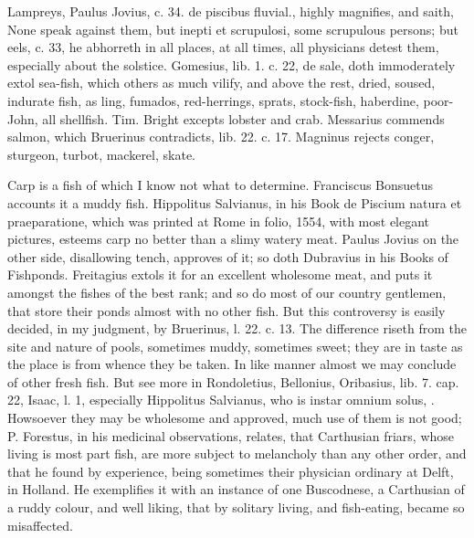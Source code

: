 {{Lampreys, Paulus Jovius, c. 34. de piscibus fluvial., highly magnifies,
and saith, None speak against them, but inepti et scrupulosi, some
scrupulous persons; but eels, c. 33, he abhorreth in all places,
at all times, all physicians detest them, especially about the
solstice. Gomesius, lib. 1. c. 22, de sale, doth immoderately extol
sea-fish, which others as much vilify, and above the rest, dried,
soused, indurate fish, as ling, fumados, red-herrings, sprats,
stock-fish, haberdine, poor-John, all shellfish. Tim. Bright
excepts lobster and crab. Messarius commends salmon, which Bruerinus
contradicts, lib. 22. c. 17. Magninus rejects conger, sturgeon, turbot,
mackerel, skate.

Carp is a fish of which I know not what to determine. Franciscus
Bonsuetus accounts it a muddy fish. Hippolitus Salvianus, in his Book
de Piscium natura et praeparatione, which was printed at Rome in folio,
1554, with most elegant pictures, esteems carp no better than a slimy
watery meat. Paulus Jovius on the other side, disallowing tench,
approves of it; so doth Dubravius in his Books of Fishponds. Freitagius
extols it for an excellent wholesome meat, and puts it amongst
the fishes of the best rank; and so do most of our country gentlemen,
that store their ponds almost with no other fish. But this controversy
is easily decided, in my judgment, by Bruerinus, l. 22. c. 13. The
difference riseth from the site and nature of pools, sometimes
muddy, sometimes sweet; they are in taste as the place is from whence
they be taken. In like manner almost we may conclude of other fresh
fish. But see more in Rondoletius, Bellonius, Oribasius, lib. 7. cap.
22, Isaac, l. 1, especially Hippolitus Salvianus, who is instar omnium
solus, \etc{}. Howsoever they may be wholesome and approved, much use of
them is not good; P. Forestus, in his medicinal observations,
relates, that Carthusian friars, whose living is most part fish,
are more subject to melancholy than any other order, and that he found
by experience, being sometimes their physician ordinary at Delft, in
Holland. He exemplifies it with an instance of one Buscodnese, a
Carthusian of a ruddy colour, and well liking, that by solitary living,
and fish-eating, became so misaffected.

}}
